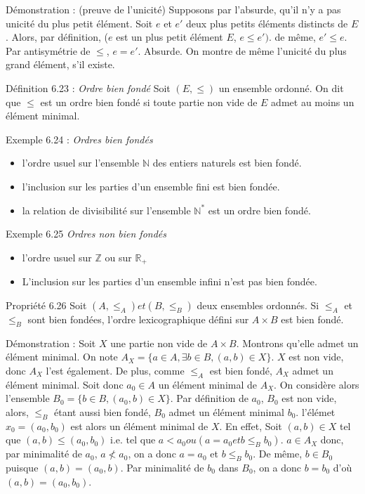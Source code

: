 \documentclass{article}
\begin{document}
\begin{adjustwidth}{-3cm}{-3cm}
Démonstration : (preuve de l'unicité)
Supposons par l'absurde, qu'il n'y a pas unicité du plus petit élément. 
Soit $e$ et $e'$ deux plus petits éléments distincts de $E$. 
Alors, par définition, ($e$ est un plus petit élément $E$, $e \leq e')$. de même, $e' \leq e$. 
Par antisymétrie de $\leq$, $e=e'$. Absurde.
On montre de même l'unicité du plus grand élément, s'il existe.

Définition 6.23 : \textit{Ordre bien fondé}
Soit $(E,\leq)$ un ensemble ordonné.
On dit que $\leq$ est un ordre bien fondé si toute partie non vide de $E$ admet au moins un élément minimal.

Exemple 6.24 : \textit{Ordres bien fondés}
    \begin{itemize}
        \item l'ordre usuel sur l'ensemble $\mathbb{N}$ des entiers naturels est bien fondé.
        \item l'inclusion sur les parties d'un ensemble fini est bien fondée.
        \item la relation de divisibilité sur l'ensemble $\mathbb{N}^*$ est un ordre bien fondé.
    \end{itemize}

    Exemple 6.25 \textit{Ordres non bien fondés}
    \begin{itemize}
        \item l'ordre usuel sur $\mathbb{Z}$ ou sur $\mathbb{R_+}$
        \item L'inclusion sur les parties d'un ensemble infini n'est pas bien fondée.
    \end{itemize}

    Propriété 6.26
    Soit $(A,\leq_A) et (B,\leq_B)$ deux ensembles ordonnés.
    Si $\leq_A$ et $\leq_B$ sont bien fondées, l'ordre lexicographique défini sur $A \times B$ est bien fondé.

    Démonstration : 
    Soit $X$ une partie non vide de $A \times B$. Montrons qu'elle admet un élément minimal.
    On note $A_X = \{a \in A, \exists b \in B, (a,b) \in X\}$. $X$ est non vide, donc $A_X$ l'est également.
    De plus, comme $\leq_A$ est bien fondé, $A_X$ admet un élément minimal.
    Soit donc $a_0 \in A$ un élément minimal de $A_X$. On considère alors l'ensemble $B_0 = \{b \in B, (a_0,b) \in X\}$.
    Par définition de $a_0$, $B_0$ est non vide, alors, $\leq_B$ étant aussi bien fondé, $B_0$ admet un élément minimal $b_0$. l'élémet $x_0 = (a_0, b_0)$ est alors un élément minimal de $X$.
    En effet, Soit $(a,b) \in X$ tel que $(a,b) \leq (a_0,b_0)$ i.e. tel que $a < a_0 ou (a = a_0 et b \leq_B b_0)$.
    $a \in A_X$ donc, par minimalité de $a_0$, $a \nless a_0$, on a donc $a = a_0$ et $b \leq_B b_0$.
    De même, $b \in B_0$ puisque $(a,b) = (a_0,b)$. Par minimalité de $b_0$ dans $B_0$, on a donc $b = b_0$ d'où $(a,b) = (a_0,b_0)$.


\end{adjustwidth}
\end{document}
